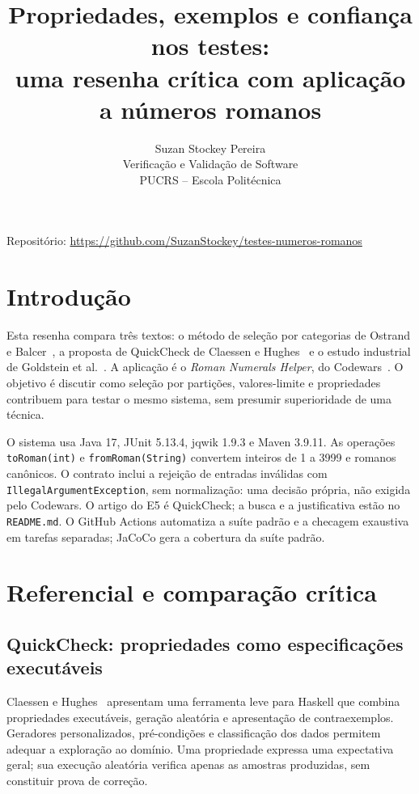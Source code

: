 \documentclass[11pt,a4paper]{article}
\title{Propriedades, exemplos e confiança nos testes:\\uma resenha crítica com aplicação a números romanos}
\author{Suzan Stockey Pereira\\Verificação e Validação de Software\\PUCRS -- Escola Politécnica}
\date{}
\newcommand{\code}[1]{\texttt{#1}}
\begin{document}
\maketitle
\vspace{-1.5em}
\begin{center}\small Repositório: \url{https://github.com/SuzanStockey/testes-numeros-romanos}\end{center}

\section{Introdução}
Esta resenha compara três textos: o método de seleção por categorias de Ostrand e Balcer~\cite{category}, a proposta de QuickCheck de Claessen e Hughes~\cite{quickcheck} e o estudo industrial de Goldstein et al.~\cite{practice}. A aplicação é o \emph{Roman Numerals Helper}, do Codewars~\cite{kata}. O objetivo é discutir como seleção por partições, valores-limite e propriedades contribuem para testar o mesmo sistema, sem presumir superioridade de uma técnica.

O sistema usa Java 17, JUnit 5.13.4, jqwik 1.9.3 e Maven 3.9.11. As operações \code{toRoman(int)} e \code{fromRoman(String)} convertem inteiros de 1 a 3999 e romanos canônicos. O contrato inclui a rejeição de entradas inválidas com \code{IllegalArgumentException}, sem normalização: uma decisão própria, não exigida pelo Codewars. O artigo do E5 é QuickCheck; a busca e a justificativa estão no \code{README.md}. O GitHub Actions automatiza a suíte padrão e a checagem exaustiva em tarefas separadas; JaCoCo gera a cobertura da suíte padrão.

\section{Referencial e comparação crítica}
\subsection{QuickCheck: propriedades como especificações executáveis}
Claessen e Hughes~\cite{quickcheck} apresentam uma ferramenta leve para Haskell que combina propriedades executáveis, geração aleatória e apresentação de contraexemplos. Geradores personalizados, pré-condições e classificação dos dados permitem adequar a exploração ao domínio. Uma propriedade expressa uma expectativa geral; sua execução aleatória verifica apenas as amostras produzidas, sem constituir prova de correção.
\end{document}
